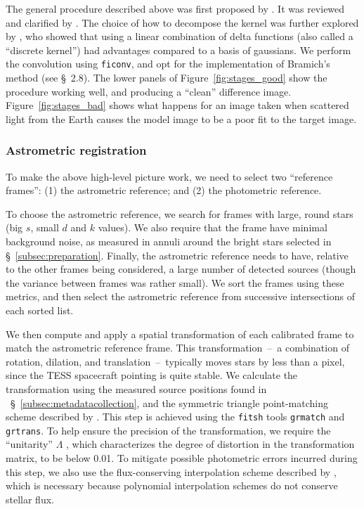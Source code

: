 \documentclass[12pt,twocolumn,tighten]{aastex62}
\begin{document}
The general procedure described above was first proposed by
\citet{Alard_Lupton_1998}.  It was reviewed and clarified by
\citet{miller_optimal_2008}.  The choice of how to decompose the
kernel was further explored by \citet{bramich_new_2008}, who showed
that using a linear combination of delta functions (also called
a ``discrete kernel'') had advantages
compared to a basis of gaussians.  We perform the convolution using
\texttt{ficonv}, and opt for the implementation of Bramich's method
(see \citealt{Pal_2009} \S~2.8).  The lower panels of
Figure~\ref{fig:stages_good} show the procedure working well, and
producing a ``clean'' difference image.  Figure~\ref{fig:stages_bad}
shows what happens for an image taken when scattered light from the
Earth causes the model image to be a poor fit to the target
image.


\subsubsection{Astrometric registration}

To make the above high-level picture work, we need to select
two ``reference frames'':
(1) the astrometric reference; and (2) the photometric reference.

To choose the astrometric reference, we search for frames with
large, round stars (big $s$, small $d$ and $k$ values).  We also
require that the frame have minimal background noise, as measured in
annuli around the bright stars selected in
\S~\ref{subsec:preparation}.  Finally, the astrometric reference
needs to have, relative to the other frames being considered, a large
number of detected sources (though the variance between frames was rather 
small).  We sort the frames
using these metrics, and then select the astrometric reference from
successive intersections of each sorted list.

We then compute and apply a spatial transformation of each calibrated
frame to match the astrometric reference frame.  This
transformation~--~a combination of rotation, dilation, and
translation~--~typically moves stars by less than a pixel, since the
TESS spacecraft pointing is quite stable.  We calculate the transformation
using the measured source positions found in
~\S~\ref{subsec:metadatacollection}, and the symmetric triangle
point-matching scheme described by \citet[][~\S~2.5.2]{Pal_2009}.
This step is achieved using the \texttt{fitsh} tools \texttt{grmatch} and
\texttt{grtrans}.  To help ensure the precision of the transformation,
we require the ``unitarity'' $\Lambda$
\citep[][~Eq.~54]{Pal_2009}, which characterizes the degree of
distortion in the transformation matrix, to be below 0.01.  To
mitigate possible photometric errors incurred during this step, we
also use the flux-conserving interpolation scheme described by
\citet{Pal_2009}, which is necessary because polynomial interpolation
schemes do not conserve stellar flux. 
\end{document}
